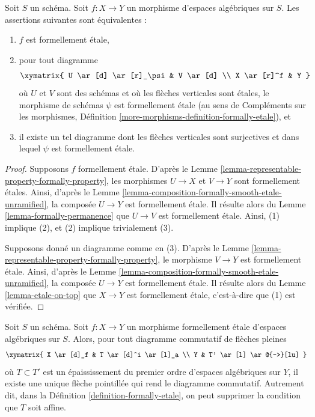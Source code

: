 \begin{lemma}
\label{lemma-formally-etale}
Soit $S$ un schéma. Soit $f : X \to Y$ un morphisme d'espaces algébriques sur
$S$. Les assertions suivantes sont équivalentes :
\begin{enumerate}
\item $f$ est formellement étale,
\item pour tout diagramme
$$
\xymatrix{
U \ar[d] \ar[r]_\psi & V \ar[d] \\
X \ar[r]^f & Y
}
$$
où $U$ et $V$ sont des schémas et où les flèches verticales sont étales,
le morphisme de schémas $\psi$ est formellement étale (au sens de
Compléments sur les morphismes,
Définition \ref{more-morphisms-definition-formally-etale}), et
\item il existe un tel diagramme dont les flèches verticales sont surjectives et dans lequel
$\psi$ est formellement étale.
\end{enumerate}
\end{lemma}

\begin{proof}
Supposons $f$ formellement étale. D'après le
Lemme \ref{lemma-representable-property-formally-property},
les morphismes $U \to X$ et $V \to Y$ sont formellement étales. Ainsi, d'après le
Lemme \ref{lemma-composition-formally-smooth-etale-unramified},
la composée $U \to Y$ est formellement étale. Il résulte alors du
Lemme \ref{lemma-formally-permanence}
que $U \to V$ est formellement étale. Ainsi, (1) implique (2), et (2)
implique trivialement (3).

\medskip\noindent
Supposons donné un diagramme comme en (3). D'après le
Lemme \ref{lemma-representable-property-formally-property},
le morphisme $V \to Y$ est formellement étale. Ainsi, d'après le
Lemme \ref{lemma-composition-formally-smooth-etale-unramified},
la composée $U \to Y$ est formellement étale. Il résulte alors du
Lemme \ref{lemma-etale-on-top}
que $X \to Y$ est formellement étale, c'est-à-dire que (1) est vérifiée.
\end{proof}

\begin{lemma}
\label{lemma-formally-etale-not-affine}
Soit $S$ un schéma.
Soit $f : X \to Y$ un morphisme formellement étale d'espaces algébriques sur $S$.
Alors, pour tout diagramme commutatif de flèches pleines
$$
\xymatrix{
X \ar[d]_f & T \ar[d]^i \ar[l]_a \\
Y & T' \ar[l] \ar@{-->}[lu]
}
$$
où $T \subset T'$ est un épaississement du premier ordre d'espaces algébriques
sur $Y$, il existe une unique flèche pointillée qui rend le diagramme commutatif.
Autrement dit, dans la
Définition \ref{definition-formally-etale},
on peut supprimer la condition que $T$ soit affine.
\end{lemma}

